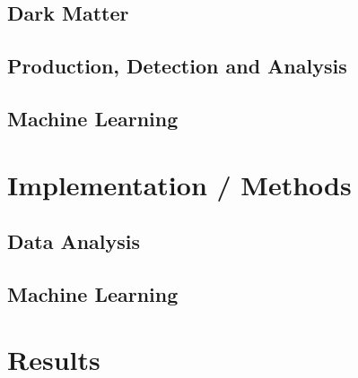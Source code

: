 \documentclass[14pt, a4paper]{book}
\begin{document}
\chapter{Dark Matter}\label{chap:DM}


\chapter{Production, Detection and Analysis}\label{chap:CERN_method}


\chapter{Machine Learning}



\part{Implementation / Methods}


\chapter{Data Analysis}\label{chap:data_anal}


\chapter{Machine Learning}\label{chap:ML}


\part{Results}

\graphicspath{{figures/}}
\end{document}
